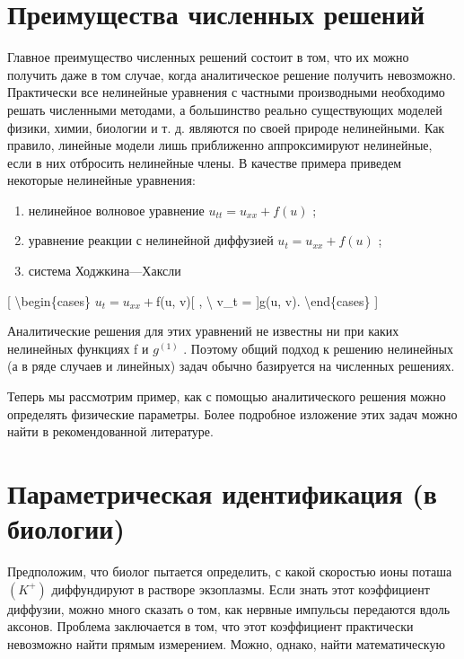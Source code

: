 \documentclass[
]{article}
\begin{document}
{{{\section{Преимущества численных
решений}\label{ux43fux440ux435ux438ux43cux443ux449ux435ux441ux442ux432ux430-ux447ux438ux441ux43bux435ux43dux43dux44bux445-ux440ux435ux448ux435ux43dux438ux439}

Главное преимущество численных решений состоит в том, что их можно
получить даже в том случае, когда аналитическое решение получить
невозможно. Практически все нелинейные уравнения с частными производными
необходимо решать численными методами, а большинство реально
существующих моделей физики, химии, биологии и т. д. являются по своей
природе нелинейными. Как правило, линейные модели лишь приближенно
аппроксимируют нелинейные, если в них отбросить нелинейные члены. В
качестве примера приведем некоторые нелинейные уравнения:

\begin{enumerate}
\def\labelenumi{\arabic{enumi})}
\item
  нелинейное волновое уравнение \(u_{tt} = u_{xx} + f(u)\) ;
\item
  уравнение реакции с нелинейной диффузией \(u_t = u_{xx} + f(u)\) ;
\item
  система Ходжкина---Хаксли
\end{enumerate}

{[} \textbackslash begin\{cases\} \(u_t = u_{xx} +\)f(u, v){[} ,
\textbackslash{} v\_t = {]}g(u, v). \textbackslash end\{cases\} {]}

Аналитические решения для этих уравнений не известны ни при каких
нелинейных функциях f и \(g^{(1)}\) . Поэтому общий подход к решению
нелинейных (а в ряде случаев и линейных) задач обычно базируется на
численных решениях.

Теперь мы рассмотрим пример, как с помощью аналитического решения можно
определять физические параметры. Более подробное изложение этих задач
можно найти в рекомендованной литературе.

\section{Параметрическая идентификация (в
биологии)}\label{ux43fux430ux440ux430ux43cux435ux442ux440ux438ux447ux435ux441ux43aux430ux44f-ux438ux434ux435ux43dux442ux438ux444ux438ux43aux430ux446ux438ux44f-ux432-ux431ux438ux43eux43bux43eux433ux438ux438}

Предположим, что биолог пытается определить, с какой скоростью ионы
поташа \((K^+)\) диффундируют в растворе экзоплазмы. Если знать этот
коэффициент диффузии, можно много сказать о том, как нервные импульсы
передаются вдоль аксонов. Проблема заключается в том, что этот
коэффициент практически невозможно найти прямым измерением. Можно,
однако, найти математическую

}}}
\end{document}
